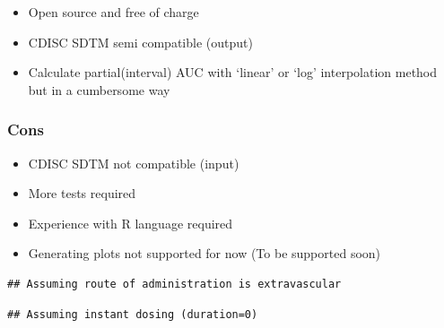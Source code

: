 \documentclass[]{krantz}
\makeatletter
\newenvironment{Shaded}{\begin{snugshade}}{\end{snugshade}}
\newcommand{\KeywordTok}[1]{\textcolor[rgb]{0.13,0.29,0.53}{\textbf{#1}}}
\newcommand{\DecValTok}[1]{\textcolor[rgb]{0.00,0.00,0.81}{#1}}
\newcommand{\StringTok}[1]{\textcolor[rgb]{0.31,0.60,0.02}{#1}}
\newcommand{\OperatorTok}[1]{\textcolor[rgb]{0.81,0.36,0.00}{\textbf{#1}}}
\newcommand{\NormalTok}[1]{#1}
\providecommand{\tightlist}{%
  \setlength{\itemsep}{0pt}\setlength{\parskip}{0pt}}
\newenvironment{kframe}{%
\medskip{}
\setlength{\fboxsep}{.8em}
 \def\at@end@of@kframe{}%
 \ifinner\ifhmode%
  \def\at@end@of@kframe{\end{minipage}}%
  \begin{minipage}{\columnwidth}%
 \fi\fi%
 \def\FrameCommand##1{\hskip\@totalleftmargin \hskip-\fboxsep
 \colorbox{shadecolor}{##1}\hskip-\fboxsep
     \hskip-\linewidth \hskip-\@totalleftmargin \hskip\columnwidth}%
 \MakeFramed {\advance\hsize-\width
   \@totalleftmargin\z@ \linewidth\hsize
   \@setminipage}}%
 {\par\unskip\endMakeFramed%
 \at@end@of@kframe}
\renewenvironment{Shaded}{\begin{kframe}}{\end{kframe}}
\theoremstyle{definition}
\theoremstyle{definition}
\theoremstyle{definition}
\theoremstyle{remark}
\makeatother
\begin{document}
\begin{itemize}
\tightlist
\item
  Open source and free of charge
\item
  CDISC SDTM semi compatible (output)
\item
  Calculate partial(interval) AUC with `linear' or `log' interpolation
  method but in a cumbersome way
\end{itemize}

\subsubsection{Cons}\label{cons-1}

\begin{itemize}
\tightlist
\item
  CDISC SDTM not compatible (input)
\item
  More tests required
\item
  Experience with R language required
\item
  Generating plots not supported for now (To be supported soon)
\end{itemize}

\begin{Shaded}
\end{Shaded}

\begin{verbatim}
## Assuming route of administration is extravascular
\end{verbatim}

\begin{verbatim}
## Assuming instant dosing (duration=0)
\end{verbatim}
\end{document}
